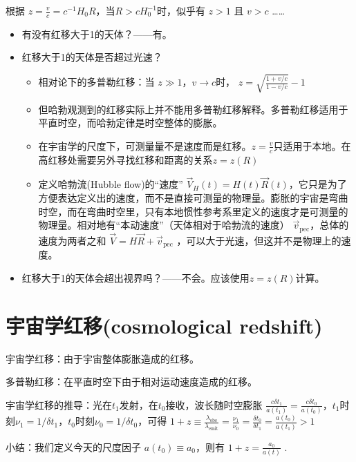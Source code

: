 \documentclass[]{ctexart}
\begin{document}

根据 $z=\frac{v}{c}=c^{-1} H_0 R$，当$R>c H_0^{-1}$时，似乎有 $z>1$ 且 $v>c$ ……

\begin{itemize}
    \item 有没有红移大于1的天体？——有。
    \item 红移大于1的天体是否超过光速？
    \begin{itemize}
        \item 相对论下的多普勒红移：当 $z\gg 1$，$v\rightarrow c$时， $z=\sqrt{\frac{1+v/c}{1-v/c}}-1$ 
        \item 但哈勃观测到的红移实际上并不能用多普勒红移解释。多普勒红移适用于平直时空，而哈勃定律是时空整体的膨胀。
        \item 在宇宙学的尺度下，可测量量不是速度而是红移。$z=\frac{v}{c}$只适用于本地。在高红移处需要另外寻找红移和距离的关系$z=z(R)$
        \item 定义哈勃流(Hubble flow)的“速度” $\vec{V}_H(t)=H(t) \vec{R}(t)$，它只是为了方便表达定义出的速度，而不是直接可测量的物理量。膨胀的宇宙是弯曲时空，而在弯曲时空里，只有本地惯性参考系里定义的速度才是可测量的物理量。相对地有“本动速度”（天体相对于哈勃流的速度） $\vec{v}_\text{pec}$，总体的速度为两者之和 $\vec{V} = H\vec{R}+\vec{v}_\text{pec}$ ，可以大于光速，但这并不是物理上的速度。
    \end{itemize}
    \item 红移大于1的天体会超出视界吗？——不会。应该使用$z=z(R)$计算。
\end{itemize}

\section{宇宙学红移(cosmological redshift)}

宇宙学红移：由于宇宙整体膨胀造成的红移。
\par 多普勒红移：在平直时空下由于相对运动速度造成的红移。

宇宙学红移的推导：光在$t_1$发射，在$t_0$接收，波长随时空膨胀
$\frac{c\delta t_1}{a(t_1)} = \frac{c\delta t_0}{a(t_0)}$，$t_1$时刻$\nu_1 = 1/\delta t_1$，$t_0$时刻$\nu_0 = 1/\delta t_0$，可得 $1+z\equiv \frac{\lambda_\text{obs}}{\lambda_\text{emit}} = \frac{\nu_1}{\nu_0} = \frac{\delta t_0}{\delta t_1}= \frac{a(t_0)}{a(t_1)} >1$

小结：我们定义今天的尺度因子 $a(t_0)\equiv a_0$，则有 $1+z=\frac{a_0}{a(t)}$ .
\end{document}
